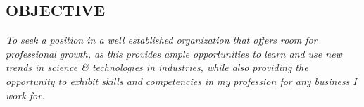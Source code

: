 \documentclass[margin]{res}
\begin{document}
\address{
    \\Street No. 2,\\
    Rampara, Jeshingpara,\\
    Amreli, Amreli\\
    Gujarat - 365601
}
\address{\\email-id: \href{3398abhinav@gmail.com}{3398abhinav@gmail.com} \\Contact: (+91) 9586-392952\\
\newline\texttt{[image: photo.jpg]}}

\begin{resume}

    \section{OBJECTIVE}
    {\sl To seek a position in a well established organization that offers room for professional growth, as this provides ample opportunities to learn and use new trends in science \& technologies in industries, while also providing the opportunity to exhibit skills and competencies in my profession for any business I work for.}
    

\end{resume}
\(\)
\end{document}
